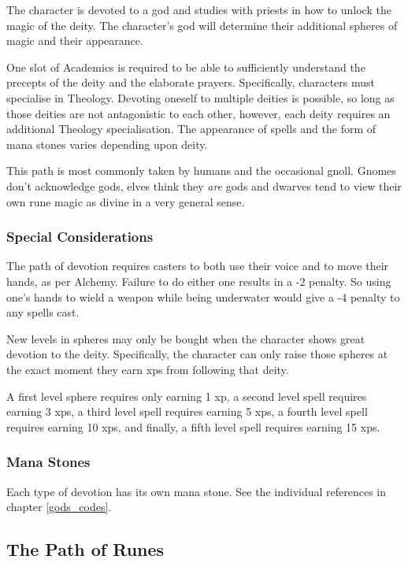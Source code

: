 \begin{multicols}{2}
\noindent The character is devoted to a god and studies with priests in how to unlock the magic of the deity. The character's god will determine their additional spheres of magic and their appearance.

One slot of Academics is required to be able to sufficiently understand the precepts of the deity and the elaborate prayers. Specifically, characters must specialise in Theology. Devoting oneself to multiple deities is possible, so long as those deities are not antagonistic to each other, however, each deity requires an additional Theology specialisation. The appearance of spells and the form of mana stones varies depending upon deity.

This path is most commonly taken by humans and the occasional gnoll. Gnomes don't acknowledge gods, elves think they \emph{are} gods and dwarves tend to view their own rune magic as divine in a very general sense.

\subsubsection{Special Considerations}

The path of devotion requires casters to both use their voice and to move their hands, as per Alchemy. Failure to do either one results in a -2 penalty. So using one's hands to wield a weapon while being underwater would give a -4 penalty to any spells cast.

New levels in spheres may only be bought when the character shows great devotion to the deity.
Specifically, the character can only raise those spheres at the exact moment they earn \glspl{xp} from following that deity.

A first level sphere requires only earning 1 \gls{xp}, a second level spell requires earning 3 \glspl{xp}, a third level spell requires earning 5 \glspl{xp}, a fourth level spell requires earning 10 \glspl{xp}, and finally, a fifth level spell requires earning 15 \glspl{xp}.

\subsubsection{Mana Stones}

Each type of devotion has its own mana stone.
See the individual references in chapter \ref{gods_codes}.

\subsection{The Path of Runes}


\end{multicols}
